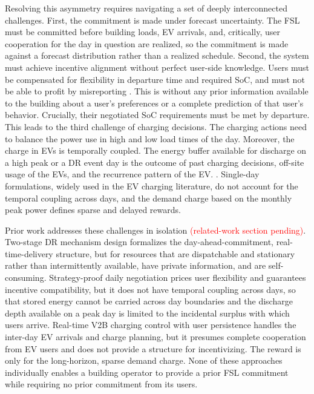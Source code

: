 Resolving this asymmetry requires navigating a set of deeply interconnected challenges. First, the commitment is made under forecast uncertainty. The FSL must be committed before building loads, EV arrivals, and, critically, user cooperation for the day in question are realized, so the commitment is made against a forecast distribution rather than a realized schedule.  Second, the system must achieve incentive alignment without perfect user-side knowledge. Users must be compensated for flexibility in departure time and required SoC, and must not be able to profit by misreporting \cite{sen2026negotiations}. This is without any prior information available to the building about a user's preferences or a complete prediction of that user's behavior. Crucially, their negotiated SoC requirements must be met by departure. This leads to the third challenge of charging decisions. The charging actions need to balance the power use in high and low load times of the day. Moreover, the charge in EVs is temporally coupled. The energy buffer available for discharge on a high peak or a DR event day is the outcome of past charging decisions, off-site usage of the EVs, and the recurrence pattern of the EV. \cite{iccps2026_pv2b}. Single-day formulations, widely used in the EV charging literature, do not account for the temporal coupling across days, and the demand charge based on the monthly peak power defines sparse and delayed rewards.
 
Prior work addresses these challenges in isolation \textcolor{red}{(related-work section pending)}. Two-stage DR mechanism design \cite{satchidanandan2022two} formalizes the day-ahead-commitment, real-time-delivery structure, but for resources that are dispatchable and stationary rather than intermittently available, have private information, and are self-consuming. Strategy-proof daily negotiation \cite{sen2026negotiations} prices user flexibility and guarantees incentive compatibility, but it does not have temporal coupling across days, so that stored energy cannot be carried across day boundaries and the discharge depth available on a peak day is limited to the incidental surplus with which users arrive. Real-time V2B charging control with user persistence \cite{iccps2026_pv2b} handles the inter-day EV arrivals and charge planning, but it presumes complete cooperation from EV users and does not provide a structure for incentivizing. The reward is only for the long-horizon, sparse demand charge.  None of these approaches individually enables a building operator to provide a prior FSL commitment while requiring no prior commitment from its users.
 

